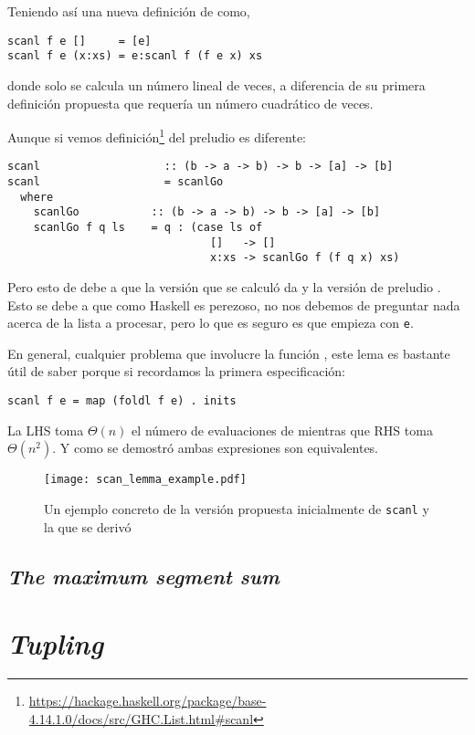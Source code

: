 Teniendo así una nueva definición de  como,
\begin{verbatim}
scanl f e []     = [e]
scanl f e (x:xs) = e:scanl f (f e x) xs
\end{verbatim}

donde  solo se calcula un número lineal de veces, a diferencia de su primera definición
propuesta que requería un número cuadrático de veces.

Aunque si vemos definición\footnote{
\url{https://hackage.haskell.org/package/base-4.14.1.0/docs/src/GHC.List.html\#scanl}
} del preludio es diferente:
\begin{verbatim}
scanl                   :: (b -> a -> b) -> b -> [a] -> [b]
scanl                   = scanlGo
  where
    scanlGo           :: (b -> a -> b) -> b -> [a] -> [b]
    scanlGo f q ls    = q : (case ls of
                               []   -> []
                               x:xs -> scanlGo f (f q x) xs)
\end{verbatim}

Pero esto de debe a que la versión que se calculó da  y la
versión de preludio . Esto se debe a que como Haskell
es perezoso, no nos debemos de preguntar nada acerca de la lista a procesar, pero lo que es seguro
es que empieza con \texttt{e}.

En general, cualquier problema que involucre la función , este lema es bastante útil
de saber porque si recordamos la primera especificación:
\begin{verbatim}
scanl f e = map (foldl f e) . inits
\end{verbatim}

La LHS toma $\Theta(n)$ el número de evaluaciones de  mientras que RHS toma $\Theta(n^2)$.
Y como se demostró ambas expresiones son equivalentes.

\begin{figure}[h]
\caption{Un ejemplo concreto de la versión propuesta inicialmente de \texttt{scanl} y la que se derivó}
\centering
\texttt{[image: scan\_lemma\_example.pdf]}
\end{figure}

\subsection{\textit{The maximum segment sum}}

\section{\textit{Tupling}}
